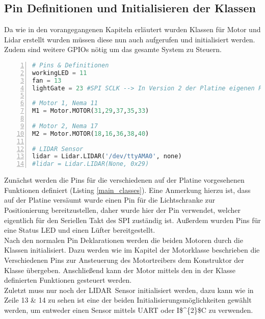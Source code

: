 \subsection{Pin Definitionen und Initialisieren der Klassen}
Da wie in den vorangegangenen Kapiteln erläutert wurden Klassen für Motor und Lidar erstellt wurden müssen diese nun auch aufgerufen und initialisiert werden. Zudem sind weitere \acp{GPIO} nötig um das gesamte System zu Steuern.
\begin{lstlisting}[caption={Initialisieren von Variablen und Klassen}, language={Python}, label={main_classes}, numbers=left]
# Pins & Definitionen
workingLED = 11
fan = 13
lightGate = 23 #SPI SCLK --> In Version 2 der Platine eigenen Pin zuweisen

# Motor 1, Nema 11
M1 = Motor.MOTOR(31,29,37,35,33)

# Motor 2, Nema 17
M2 = Motor.MOTOR(18,16,36,38,40)

# LIDAR Sensor
lidar = Lidar.LIDAR('/dev/ttyAMA0', none)
#lidar = Lidar.LIDAR(None, 0x29)
\end{lstlisting}
Zunächst werden die Pins für die verschiedenen auf der Platine vorgesehenen Funktionen definiert (Listing \ref{main_classes}). Eine Anmerkung hierzu ist, dass auf der Platine versäumt wurde einen Pin für die Lichtschranke zur Positionierung bereitzustellen, daher wurde hier der Pin verwendet, welcher eigentlich für den Seriellen Takt des \ac{SPI} zuständig ist. Außerdem wurden Pins für eine Status \ac{LED} und einen Lüfter bereitgestellt. \\
Nach den normalen Pin Deklarationen werden die beiden Motoren durch die Klassen initialisiert. Dazu werden wie im Kapitel der Motorklasse beschrieben die Verschiedenen Pins zur Ansteuerung des Motortreibers dem Konstruktor der Klasse übergeben. Anschließend kann der Motor mittels den in der Klasse definierten Funktionen gesteuert werden.\\
Zuletzt muss nur noch der \ac{LIDAR} Sensor initialisiert werden, dazu kann wie in Zeile 13 \& 14 zu sehen ist eine der beiden Initialisierungsmöglichkeiten gewählt werden, um entweder einen Sensor mittels \ac{UART} oder \ac{I$^{2}$C} zu verwenden.\\
